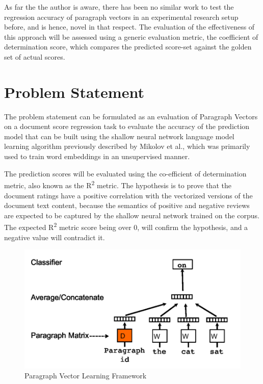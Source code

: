 \documentclass[conference]{IEEEtran}
\begin{document}
    As far the the author is aware, there has been no similar work to test the regression accuracy of paragraph vectors in an experimental research setup before, and is hence, novel in that respect.
    The evaluation of the effectiveness of this approach will be assessed using a generic evaluation metric, the coefficient of determination score, which compares the predicted score-set against the golden set of actual scores.

\vspace{5mm}

\section{Problem Statement} \label{problem_statment}
    The problem statement can be formulated as an evaluation of Paragraph Vectors\cite{le2014distributed} on a document score regression task to evaluate the accuracy of the prediction model that can be built using the shallow neural network language model learning algorithm previously described by Mikolov et al.\cite{mikolov2013efficient}, which was primarily used to train word embeddings in an unsupervised manner.

    The prediction scores will be evaluated using the co-efficient of determination metric, also known as the R\textsuperscript{2} metric\cite{cameron1997r}. 
    The hypothesis is to prove that the document ratings have a positive correlation with the vectorized versions of the document text content, because the semantics of positive and negative reviews are expected to be captured by the shallow neural network trained on the corpus.
    The expected R\textsuperscript{2} metric score being over 0, will confirm the hypothesis, and a negative value will contradict it.

\begin{figure}[ht]
    \centering
    \includegraphics[width=400pt]{images/docvec_1.png}
    \caption{Paragraph Vector Learning Framework\cite{mikolov2013distributed}}
    \label{fig:paragraph-vector-framework}
\end{figure}
\end{document}
